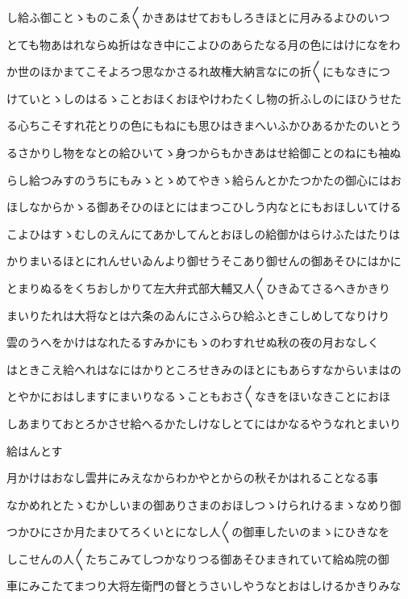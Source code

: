 \documentclass[a4paper,11pt,landscape]{ltjtarticle}
\begin{document}
\par\medskip
し給ふ御ことゝものこゑ〱かきあはせておもしろきほとに月みるよひのいつ
\par\medskip
とても物あはれならぬ折はなき中にこよひのあらたなる月の色にはけになをわ
\par\medskip
か世のほかまてこそよろつ思なかさるれ故権大納言なにの折〱にもなきにつ
\par\medskip
けていとゝしのはるゝことおほくおほやけわたくし物の折ふしのにほひうせた
\par\medskip
る心ちこそすれ花とりの色にもねにも思ひはきまへいふかひあるかたのいとう
\par\medskip
るさかりし物をなとの給ひいてゝ身つからもかきあはせ給御ことのねにも袖ぬ
\par\medskip
らし給つみすのうちにもみゝとゝめてやきゝ給らんとかたつかたの御心にはお
\par\medskip
ほしなからかゝる御あそひのほとにはまつこひしう内なとにもおほしいてける
\par\medskip
こよひはすゝむしのえんにてあかしてんとおほしの給御かはらけふたはたりは
\par\medskip
かりまいるほとにれんせいゐんより御せうそこあり御せんの御あそひにはかに
\par\medskip
とまりぬるをくちおしかりて左大弁式部大輔又人〱ひきゐてさるへきかきり
\par\medskip
まいりたれは大将なとは六条のゐんにさふらひ給ふときこしめしてなりけり
\par\medskip
雲のうへをかけはなれたるすみかにもゝのわすれせぬ秋の夜の月おなしく
\par\medskip
はときこえ給へれはなにはかりところせきみのほとにもあらすなからいまはの
\par\medskip
とやかにおはしますにまいりなるゝこともおさ〱なきをほいなきことにおほ
\par\medskip
しあまりておとろかさせ給へるかたしけなしとてにはかなるやうなれとまいり
\par\medskip
給はんとす
\par\medskip
月かけはおなし雲井にみえなからわかやとからの秋そかはれることなる事
\par\medskip
なかめれとたゝむかしいまの御ありさまのおほしつゝけられけるまゝなめり御
\par\medskip
つかひにさか月たまひてろくいとになし人〱の御車したいのまゝにひきなを
\par\medskip
しこせんの人〱たちこみてしつかなりつる御あそひまきれていて給ぬ院の御
\par\medskip
車にみこたてまつり大将左衛門の督とうさいしやうなとおはしけるかきりみな
\end{document}
